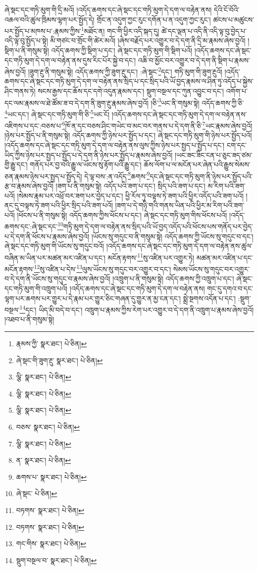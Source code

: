 ཞེ་སྡང་དང་གཏི་མུག་གི་དྲི་མའོ། །འདོད་ཆགས་དང་ཞེ་སྡང་དང་གཏི་མུག་དེ་དག་ལ་བརྟེན་ནས། དེའི་ངོ་བོའི་འཆལ་བའི་ཚུལ་ཁྲིམས་ལྷག་པར་སྤྱོད་དེ། གྲོང་ན་འདུག་ཀྱང་རུང་དགོན་པ་ན་འདུག་ཀྱང་རུང་། ཚངས་པ་མཚུངས་པར་སྤྱོད་པ་མཁས་པ་:རྣམས་ཀྱིས་\footnote{རྣམས་ཀྱི་  སྣར་ཐང་།  པེ་ཅིན། }མཐོང་ན། གང་གི་ཕྱིར་འདི་སྐད་དུ། ཚེ་དང་ལྡན་པ་འདི་ནི་འདི་ལྟ་བུ་བྱེད་པ་འདི་ལྟ་བུ་སྤྱོད་པ་སྟེ། མི་གཙང་བ་གྲོང་གི་ཚེར་མའོ། །ཞེས་བརྗོད་པར་འགྱུར་བ་དེ་དག་ནི་དྲི་མ་རྣམས་ཞེས་བྱའོ། །སྡིག་པ་ནི་གསུམ་སྟེ། འདོད་ཆགས་ཀྱི་སྡིག་པ་དང་། ཞེ་སྡང་དང་གཏི་མུག་གི་སྡིག་པའོ། །འདོད་ཆགས་དང་ཞེ་སྡང་དང་གཏི་མུག་དེ་དག་ལ་བརྟེན་ནས་དུས་རིང་པོར་སྐྱེ་བ་དང་། འཆི་བ་མྱོང་བར་འགྱུར་བ་དེ་དག་ནི་སྡིག་པ་རྣམས་ཞེས་བྱའོ། །ཟུག་རྔུ་ནི་གསུམ་སྟེ། འདོད་ཆགས་ཀྱི་ཟུག་རྔུ་དང་། :ཞེ་སྡང་\footnote{ཞེ་སྡང་གི་ཟུག་རྔུ་  སྣར་ཐང་།  པེ་ཅིན། }དང་། གཏི་མུག་གི་ཟུག་རྔུའོ། །འདོད་ཆགས་དང་ཞེ་སྡང་དང་གཏི་མུག་དེ་དག་ལ་བརྟེན་ནས་སྲིད་པ་དང་སྲིད་པའི་ཡོ་བྱད་རྣམས་ལ་ཤིན་ཏུ་འདོད་པ་སྐྱེས་ཤིང་གནས་ཏེ། སངས་རྒྱས་དང་ཆོས་དང་དགེ་འདུན་རྣམས་དང་། སྡུག་བསྔལ་དང་ཀུན་འབྱུང་བ་དང་། འགོག་པ་དང་ལམ་རྣམས་ལ་ཐེ་ཚོམ་ཟ་བ་དེ་དག་ནི་ཟུག་རྔུ་རྣམས་ཞེས་བྱའོ། །ཅི་\footnote{ལྕི་  སྣར་ཐང་།  པེ་ཅིན། }ཡང་ནི་གསུམ་སྟེ། འདོད་ཆགས་ཀྱི་ཅི་\footnote{ལྕི་  སྣར་ཐང་།  པེ་ཅིན། }ཡང་དང་། ཞེ་སྡང་དང་གཏི་མུག་གི་ཅི་\footnote{ལྕི་  སྣར་ཐང་།  པེ་ཅིན། }ཡང་ངོ། །འདོད་ཆགས་དང་ཞེ་སྡང་དང་གཏི་མུག་དེ་དག་ལ་བརྟེན་ནས་འཇིགས་པ་དང་:བཅས་པ་\footnote{བཅས་  སྣར་ཐང་།  པེ་ཅིན། }ཁོ་ན་དང་བཅས་ཤིང་གཡེང་བ་མང་བར་གནས་པ་དེ་དག་ནི་ཅི་\footnote{ལྕི་  སྣར་ཐང་།  པེ་ཅིན། }ཡང་རྣམས་ཞེས་བྱའོ། །ཉེས་པར་སྤྱོད་པ་ནི་གསུམ་སྟེ། འདོད་ཆགས་ཀྱི་ཉེས་པར་སྤྱོད་པ་དང་། ཞེ་སྡང་དང་གཏི་མུག་གི་ཉེས་པར་སྤྱོད་པའོ། །འདོད་ཆགས་དང་ཞེ་སྡང་དང་གཏི་མུག་དེ་དག་ལ་བརྟེན་ནས་ལུས་ཀྱིས་ཉེས་པར་སྤྱད་པ་སྤྱོད་པ་དང་། ངག་དང་ཡིད་ཀྱིས་ཉེས་པར་སྤྱད་པ་སྤྱོད་པ་དེ་དག་ནི་ཉེས་པར་སྤྱོད་པ་རྣམས་ཞེས་བྱའོ། །ཡང་ཟང་ཟིང་ངན་པ་ཅུང་ཟད་ཙམ་གྱི་རྒྱུ་དང་། གནོད་པར་བྱ་བའི་རྒྱུ་ལ་ཡོངས་སུ་རྟོག་པའི་རྒྱུ་དང་། ཆོས་ལོག་པ་ལ་མངོན་པར་ཞེན་པའི་རྒྱུས་སེམས་ཅན་རྣམས་ཉེས་པར་སྤྱད་པ་སྤྱོད་དེ། དེ་ལྟ་བས་:ན་འདོད་\footnote{ན་  སྣར་ཐང་།  པེ་ཅིན། }ཆགས་\footnote{ཆགས་པ་  སྣར་ཐང་།  པེ་ཅིན། }དང་ཞེ་སྡང་དང་གཏི་མུག་ནི་ཉེས་པར་སྤྱོད་པའི་རྩ་བ་རྣམས་ཞེས་བྱའོ། །ཟག་པ་ནི་གསུམ་སྟེ། འདོད་པའི་ཟག་པ་དང་། སྲིད་པའི་ཟག་པ་དང་། མ་རིག་པའི་ཟག་པའོ། །སེམས་རྣམ་པར་འཕྲོ་བར་ཟག་པར་བྱེད་པ་དང་། ཕྱི་རོལ་ཏུ་བལྟས་ཏེ་ཟག་པའི་ཕྱིར་འདོད་པའི་ཟག་པའོ། །ནང་དུ་བལྟས་ཏེ་ཟག་པའི་ཕྱིར་སྲིད་པའི་ཟག་པའོ། །ཟག་པ་དེ་གཉི་གའི་གནས་ཡིན་པའི་ཕྱིར་མ་རིག་པའི་ཟག་པའོ། །ཕོངས་པ་ནི་གསུམ་སྟེ། འདོད་ཆགས་ཀྱིས་ཕོངས་པ་དང་། ཞེ་སྡང་དང་གཏི་མུག་གིས་ཕོངས་པའོ། །འདོད་ཆགས་དང་:ཞེ་སྡང་དང་\footnote{ཞེ་སྡང་  པེ་ཅིན། }གཏི་མུག་དེ་དག་ལ་བརྟེན་ནས་སྲིད་པའི་ཡོ་བྱད་འདོད་པའི་ཕོངས་པས་གནོད་པར་བྱེད་པ་དེ་དག་ནི་ཕོངས་པ་རྣམས་ཞེས་བྱའོ། །ཡོངས་སུ་གདུང་བ་ནི་གསུམ་སྟེ། འདོད་ཆགས་ཀྱི་ཡོངས་སུ་གདུང་བ་དང་། ཞེ་སྡང་དང་གཏི་མུག་གི་ཡོངས་སུ་གདུང་བའོ། །འདོད་ཆགས་དང་ཞེ་སྡང་དང་གཏི་མུག་དེ་དག་ལ་བརྟེན་ནས་ཚུལ་བཞིན་མ་ཡིན་པར་མཚན་མར་འཛིན་པ་དང་། མངོན་རྟགས་\footnote{བཏགས་  སྣར་ཐང་།  པེ་ཅིན། }སུ་འཛིན་པར་འགྱུར་ཏེ། མཚན་མར་འཛིན་པ་དང་མངོན་རྟགས་\footnote{བཏགས་  སྣར་ཐང་།  པེ་ཅིན། }སུ་འཛིན་པ་དེས་\footnote{གང་གིས་  སྣར་ཐང་།  པེ་ཅིན། }ལུས་ཡོངས་སུ་གདུང་བར་འགྱུར་བ་དང་། སེམས་ཡོངས་སུ་གདུང་བར་འགྱུར་བ་དེ་དག་ནི་ཡོངས་སུ་གདུང་བ་རྣམས་ཞེས་བྱའོ། །འཁྲུག་པ་ནི་གསུམ་སྟེ། འདོད་ཆགས་ཀྱི་འཁྲུག་པ་དང་། ཞེ་སྡང་དང་གཏི་མུག་གི་འཁྲུག་པའོ། །འདོད་ཆགས་དང་ཞེ་སྡང་དང་གཏི་མུག་དེ་དག་ལ་བརྟེན་ནས། གང་དུ་དགའ་བ་དང་ལྷག་པར་ཆགས་པར་གྱུར་པ་དེ་རྣམ་པར་གྱུར་ཅིང་གཞན་དུ་གྱུར་ན་མྱ་ངན་དང་། སྨྲེ་སྔགས་འདོན་པ་དང་། :སྡུག་བསྔལ་\footnote{སྡུག་བསྔལ་བ་  སྣར་ཐང་།  པེ་ཅིན། }དང་། ཡིད་མི་བདེ་བ་དང་། འཁྲུག་པ་རྣམས་ཀྱིས་རེག་པར་འགྱུར་བ་དེ་དག་ནི་འཁྲུག་པ་རྣམས་ཞེས་བྱའོ། །འཐབ་པ་ནི་གསུམ་སྟེ། 